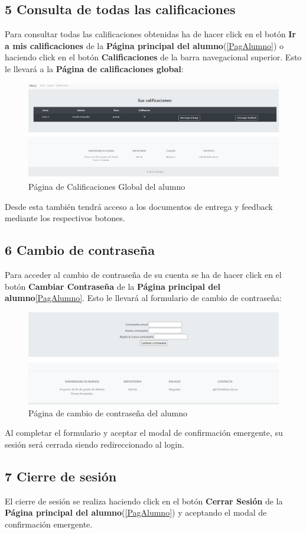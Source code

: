 \subsection{5 Consulta de todas las calificaciones}
Para consultar todas las calificaciones obtenidas ha de hacer click en el botón \textbf{Ir a mis calificaciones} de la \textbf{Página principal del alumno}(\ref{PagAlumno}) o haciendo click en el botón \textbf{Calificaciones} de la barra navegacional superior. Esto le llevará a la \textbf{Página de calificaciones global}:

\begin{figure}[H]
\centering
\includegraphics[width=\textwidth]{img/imgs-memoria/CalificacionesAlumno.PNG}
\caption{Página de Calificaciones Global del alumno}
\end{figure}

Desde esta también tendrá acceso a los documentos de entrega y feedback mediante los respectivos botones.



\subsection{6 Cambio de contraseña}
Para acceder al cambio de contraseña de su cuenta se ha de hacer click en el botón \textbf{Cambiar Contraseña} de la \textbf{Página principal del alumno}\ref{PagAlumno}. Esto le llevará al formulario de cambio de contraseña:

\begin{figure}[H]
\centering
\includegraphics[width=\textwidth]{img/imgs-memoria/CambiarContra.PNG}
\caption{Página de cambio de contraseña del alumno}
\end{figure}

Al completar el formulario y aceptar el modal de confirmación emergente, su sesión será cerrada siendo redireccionado al login.

\subsection{7 Cierre de sesión} 
El cierre de sesión se realiza haciendo click en el botón \textbf{Cerrar Sesión} de la \textbf{Página principal del alumno}(\ref{PagAlumno}) y aceptando el modal de confirmación emergente.
